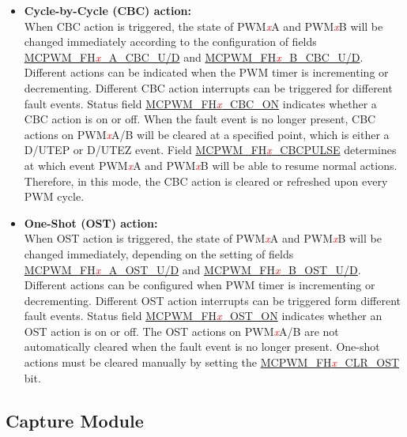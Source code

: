 \documentclass[main\_\_EN.tex]{subfiles}
\begin{document}
\begin{itemize}
    \item {\bfseries Cycle-by-Cycle (CBC) action:}\\
    When CBC action is triggered, the state of PWM\textcolor{red}{\it{x}}A and PWM\textcolor{red}{\it{x}}B will be changed immediately according to the configuration of fields \hyperref[fielddesc:MCPWMFH0ACBCU]{MCPWM\_FH\textcolor{red}{\it{x}}\_A\_CBC\_U/D} and \hyperref[fielddesc:MCPWMFH0BCBCU]{MCPWM\_FH\textcolor{red}{\it{x}}\_B\_CBC\_U/D}. Different actions can be indicated when the PWM timer is incrementing or decrementing. Different CBC action interrupts can be triggered for different fault events. Status field \hyperref[fielddesc:MCPWMFH0CBCON]{MCPWM\_FH\textcolor{red}{\it{x}}\_CBC\_ON} indicates whether a CBC action is on or off.
   When the fault event is no longer present, CBC actions on PWM\textcolor{red}{\it{x}}A/B will be cleared at a specified point, which is either a D/UTEP or D/UTEZ event. Field \hyperref[fielddesc:MCPWMFH0CBCPULSE]{MCPWM\_FH\textcolor{red}{\it{x}}\_CBCPULSE} determines at which event PWM\textcolor{red}{\it{x}}A and PWM\textcolor{red}{\it{x}}B will be able to resume normal actions. Therefore, in this mode, the CBC action is cleared or refreshed upon every PWM cycle. 
    \item {\bfseries One-Shot (OST) action:}\\
	When OST action is triggered, the state of PWM\textcolor{red}{\it{x}}A and PWM\textcolor{red}{\it{x}}B will be changed immediately, depending on the setting of fields \hyperref[fielddesc:MCPWMFH0AOSTU]{MCPWM\_FH\textcolor{red}{\it{x}}\_A\_OST\_U/D} and \hyperref[fielddesc:MCPWMFH0BOSTU]{MCPWM\_FH\textcolor{red}{\it{x}}\_B\_OST\_U/D}. Different actions can be configured when PWM timer is incrementing or decrementing. Different OST action interrupts can be triggered form different fault events. Status field \hyperref[fielddesc:MCPWMFH0OSTON]{MCPWM\_FH\textcolor{red}{\it{x}}\_OST\_ON} indicates whether an OST action is on or off.
    The OST actions on PWM\textcolor{red}{\it{x}}A/B are not automatically cleared when the fault event is no longer present. One-shot actions must be cleared manually by setting the \hyperref[fielddesc:MCPWMFH0CLROST]{MCPWM\_FH\textcolor{red}{\it{x}}\_CLR\_OST} bit.
\end{itemize}

\subsection{Capture Module}
\end{document}

